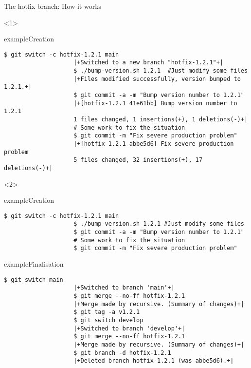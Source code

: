 \documentclass[usenames,svgnames,14pt]{beamer}
\begin{document}
\begin{frame}[fragile,c]{The hotfix branch: How it works}
    \vspace{-13mm}
    \begin{overlayarea}{\textwidth}{0.8\textheight}
        \begin{onlyenv}<1>
            \begin{varblock}{example}{Creation}
                \begin{lstlisting}[style=MyBash]
                    $ git switch -c hotfix-1.2.1 main
                    |+Switched to a new branch "hotfix-1.2.1"+|
                    $ ./bump-version.sh 1.2.1  #Just modify some files
                    |+Files modified successfully, version bumped to 1.2.1.+|
                    $ git commit -a -m "Bump version number to 1.2.1"
                    |+[hotfix-1.2.1 41e61bb] Bump version number to 1.2.1
                    1 files changed, 1 insertions(+), 1 deletions(-)+|
                    # Some work to fix the situation
                    $ git commit -m "Fix severe production problem"
                    |+[hotfix-1.2.1 abbe5d6] Fix severe production problem
                    5 files changed, 32 insertions(+), 17 deletions(-)+|
                \end{lstlisting}
            \end{varblock}
        \end{onlyenv}
        \begin{onlyenv}<2>
            \begin{varblock}{example}{Creation}
                \begin{lstlisting}[style=MyBash]
                    $ git switch -c hotfix-1.2.1 main
                    $ ./bump-version.sh 1.2.1 #Just modify some files
                    $ git commit -a -m "Bump version number to 1.2.1"
                    # Some work to fix the situation
                    $ git commit -m "Fix severe production problem"
                \end{lstlisting}
            \end{varblock}
            \vspace{-3mm}
            \begin{varblock}{example}{Finalisation}
                \begin{lstlisting}[style=MyBash]
                    $ git switch main
                    |+Switched to branch 'main'+|
                    $ git merge --no-ff hotfix-1.2.1
                    |+Merge made by recursive. (Summary of changes)+|
                    $ git tag -a v1.2.1
                    $ git switch develop
                    |+Switched to branch 'develop'+|
                    $ git merge --no-ff hotfix-1.2.1
                    |+Merge made by recursive. (Summary of changes)+|
                    $ git branch -d hotfix-1.2.1
                    |+Deleted branch hotfix-1.2.1 (was abbe5d6).+|
                \end{lstlisting}
            \end{varblock}
        \end{onlyenv}
    \end{overlayarea}
\end{frame}
\end{document}
